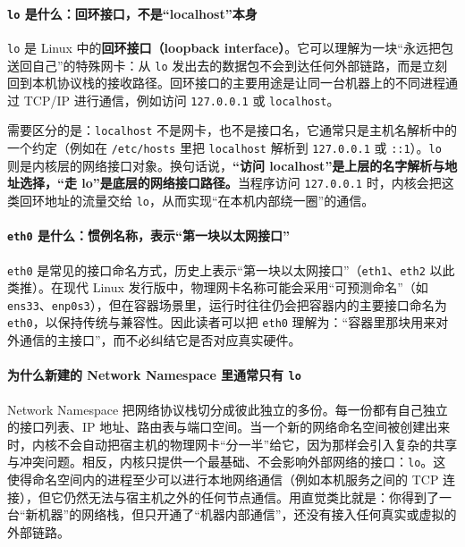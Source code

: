 \paragraph{\texttt{lo} 是什么：回环接口，不是“localhost”本身}

\texttt{lo} 是 Linux 中的\textbf{回环接口（loopback interface）}。它可以理解为一块“永远把包送回自己”的特殊网卡：从 \texttt{lo} 发出去的数据包不会到达任何外部链路，而是立刻回到本机协议栈的接收路径。回环接口的主要用途是让同一台机器上的不同进程通过 TCP/IP 进行通信，例如访问 \texttt{127.0.0.1} 或 \texttt{localhost}。

需要区分的是：\texttt{localhost} 不是网卡，也不是接口名，它通常只是主机名解析中的一个约定（例如在 \texttt{/etc/hosts} 里把 \texttt{localhost} 解析到 \texttt{127.0.0.1} 或 \texttt{::1}）。\texttt{lo} 则是内核层的网络接口对象。换句话说，\textbf{“访问 localhost”是上层的名字解析与地址选择，“走 lo”是底层的网络接口路径。}当程序访问 \texttt{127.0.0.1} 时，内核会把这类回环地址的流量交给 \texttt{lo}，从而实现“在本机内部绕一圈”的通信。

\paragraph{\texttt{eth0} 是什么：惯例名称，表示“第一块以太网接口”}

\texttt{eth0} 是常见的接口命名方式，历史上表示“第一块以太网接口”（\texttt{eth1}、\texttt{eth2} 以此类推）。在现代 Linux 发行版中，物理网卡名称可能会采用“可预测命名”（如 \texttt{ens33}、\texttt{enp0s3}），但在容器场景里，运行时往往仍会把容器内的主要接口命名为 \texttt{eth0}，以保持传统与兼容性。因此读者可以把 \texttt{eth0} 理解为：“容器里那块用来对外通信的主接口”，而不必纠结它是否对应真实硬件。

\paragraph{为什么新建的 Network Namespace 里通常只有 \texttt{lo}}

Network Namespace 把网络协议栈切分成彼此独立的多份。每一份都有自己独立的接口列表、IP 地址、路由表与端口空间。当一个新的网络命名空间被创建出来时，内核不会自动把宿主机的物理网卡“分一半”给它，因为那样会引入复杂的共享与冲突问题。相反，内核只提供一个最基础、不会影响外部网络的接口：\texttt{lo}。这使得命名空间内的进程至少可以进行本地网络通信（例如本机服务之间的 TCP 连接），但它仍然无法与宿主机之外的任何节点通信。用直觉类比就是：你得到了一台“新机器”的网络栈，但只开通了“机器内部通信”，还没有接入任何真实或虚拟的外部链路。

